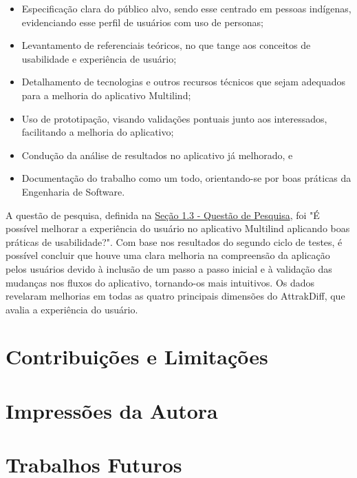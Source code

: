     \begin{itemize}
              \item Especificação clara do público alvo, sendo esse centrado em pessoas indígenas, evidenciando esse perfil de usuários com uso de personas;

              \item Levantamento de referenciais teóricos, no que tange aos conceitos de usabilidade e experiência de usuário;

              \item Detalhamento de tecnologias e outros recursos técnicos que sejam adequados para a melhoria do aplicativo Multilind;

              \item Uso de prototipação, visando validações pontuais junto aos interessados, facilitando a melhoria do aplicativo;

              \item Condução da análise de resultados no aplicativo já melhorado, e
              
              \item Documentação do trabalho como um todo, orientando-se por boas práticas da Engenharia de Software.
    \end{itemize}

A questão de pesquisa, definida na \hyperref[sec:QuestaodePesquisa]{Seção 1.3 - Questão de Pesquisa}, foi "É possível melhorar a experiência do usuário no aplicativo 
Multilind aplicando boas práticas de usabilidade?". Com base nos resultados do segundo ciclo de testes, é possível concluir que houve uma clara melhoria na compreensão da aplicação 
pelos usuários devido à inclusão de um passo a passo inicial e à validação das mudanças nos fluxos do aplicativo, tornando-os mais intuitivos. Os dados revelaram melhorias em todas 
as quatro principais dimensões do AttrakDiff, que avalia a experiência do usuário.

\section{Contribuições e Limitações}
\label{sec:Contribuições e Limitações}


\section{Impressões da Autora}
\label{sec:Impressões da Autora}


\section{Trabalhos Futuros}
\label{sec:Trabalhos Futuros}
